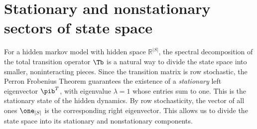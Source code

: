 \documentclass{article}
\begin{document}
\section{Stationary and nonstationary sectors of state space}
For a hidden markov model with hidden space $\mathbb{R}^{|S|}$, the spectral decomposition of the total transition operator $\Tb$ is a natural way to divide the state space into smaller, noninteracting pieces. Since the transition matrix is row stochastic, the Perron Frobenius Theorem guarantees the existence of a \textit{stationary} left eigenvector $\pib^T$, with eigenvalue $\lambda =1$ whose entries sum to one. This is the stationary state of the hidden dynamics. By row stochasticity, the vector of all ones $\one_{|S|}$ is the corresponding right eigenvector. This allows us to divide the state space into its stationary and nonstationary components. 

\section{}
\end{document}
